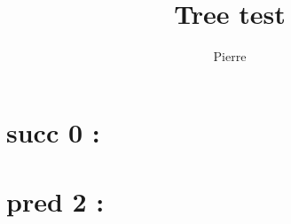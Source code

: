 \documentclass{article}
\title{Tree test}
\author{Pierre}
\begin{document}
\section*{succ 0 :}


\section*{pred 2 :}

\end{document}
